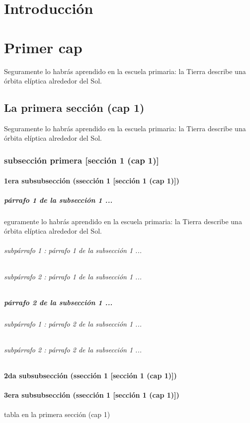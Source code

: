 \documentclass[12pt,a4paper]{report}
\begin{document}
\tableofcontents
\newpage
\begingroup
\renewcommand*{\addvspace}[1]{}
\listoffigures
\newpage
\listoftables
\endgroup

\chapter*{Introducción}

\chapter{Primer cap}
Seguramente lo habrás aprendido en la escuela primaria: la Tierra describe una órbita elíptica alrededor del Sol.
\section{La primera sección (cap 1)}
Seguramente lo habrás aprendido en la escuela primaria: la Tierra describe una órbita elíptica alrededor del Sol.
\subsection{subsección primera [sección 1 (cap 1)]}
\subsubsection{1era subsubsección (ssección 1 [sección 1 (cap 1)])}
\paragraph{párrafo 1 de la subsección 1 ...}
eguramente lo habrás aprendido en la escuela primaria: la Tierra describe una órbita elíptica alrededor del Sol.
\subparagraph{subpárrafo 1 : párrafo 1 de la subsección 1 ...}
\subparagraph{subpárrafo 2 : párrafo 1 de la subsección 1 ...}
\paragraph{párrafo 2 de la subsección 1 ...}
\subparagraph{subpárrafo 1 : párrafo 2 de la subsección 1 ...}
\subparagraph{subpárrafo 2 : párrafo 2 de la subsección 1 ...}
\subsubsection{2da subsubsección (ssección 1 [sección 1 (cap 1)])}
\subsubsection{3era subsubsección (ssección 1 [sección 1 (cap 1)])}
\begin{table}[H]
\caption{tabla en la primera sección (cap 1)}
\end{table}
\end{document}
